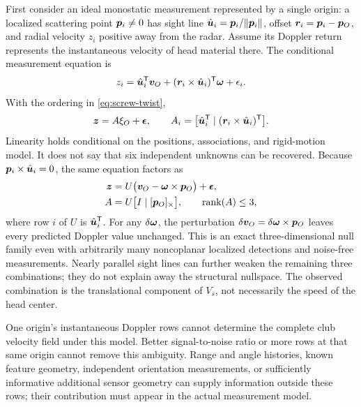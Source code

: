 First consider an ideal monostatic measurement represented by a single origin: a localized scattering point $\bm{p}_i\ne0$ has sight line $\hat{\bm{u}}_i=\bm{p}_i/\lVert\bm{p}_i\rVert$, offset $\bm{r}_i=\bm{p}_i-\bm{p}_O$, and radial velocity $z_i$ positive away from the radar.
Assume its Doppler return represents the instantaneous velocity of head material there.
The conditional measurement equation is
\begin{equation}
\label{eq:screw-doppler}
z_i=\hat{\bm{u}}_i^{\mathsf T}\bm{v}_O
 +(\bm{r}_i\times\hat{\bm{u}}_i)^{\mathsf T}\bm{\omega}+\epsilon_i.
\end{equation}
With the ordering in \cref{eq:screw-twist},
\begin{equation}
\label{eq:screw-ls}
\bm{z}=A\xi_O+\bm{\epsilon},\qquad
A_i=\bigl[\hat{\bm{u}}_i^{\mathsf T}\mid(\bm{r}_i\times\hat{\bm{u}}_i)^{\mathsf T}\bigr].
\end{equation}
Linearity holds conditional on the positions, associations, and rigid-motion model.
It does not say that six independent unknowns can be recovered.
Because $\bm{p}_i\times\hat{\bm{u}}_i=0$, the same equation factors as
\begin{equation}
\label{eq:screw-rank}
\begin{aligned}
\bm{z}&=U\bigl(\bm{v}_O-\bm{\omega}\times\bm{p}_O\bigr)+\bm{\epsilon},\\
A&=U\bigl[I\mid[\bm{p}_O]_\times\bigr],\qquad
\operatorname{rank}(A)\le3,
\end{aligned}
\end{equation}
where row $i$ of $U$ is $\hat{\bm{u}}_i^{\mathsf T}$.
For any $\delta\bm{\omega}$, the perturbation $\delta\bm{v}_O=\delta\bm{\omega}\times\bm{p}_O$ leaves every predicted Doppler value unchanged.
This is an exact three-dimensional null family even with arbitrarily many noncoplanar localized detections and noise-free measurements.
Nearly parallel sight lines can further weaken the remaining three combinations; they do not explain away the structural nullspace.
The observed combination is the translational component of $V_s$, not necessarily the speed of the head center.

\begin{keypoint}
One origin's instantaneous Doppler rows cannot determine the complete club velocity field under this model.
Better signal-to-noise ratio or more rows at that same origin cannot remove this ambiguity.
Range and angle histories, known feature geometry, independent orientation measurements, or sufficiently informative additional sensor geometry can supply information outside these rows; their contribution must appear in the actual measurement model.
\end{keypoint}

